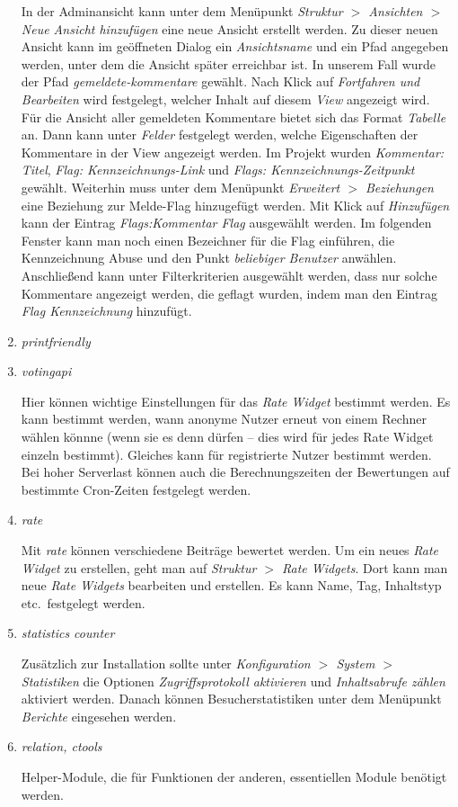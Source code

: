 \documentclass[a4paper,11pt,twoside]{article}
\begin{document}
\begin{enumerate}
In der Adminansicht kann unter dem Menüpunkt \textit{Struktur $>$ Ansichten
  $>$ Neue Ansicht hinzufügen} eine neue Ansicht erstellt werden. Zu dieser
neuen Ansicht kann im geöffneten Dialog ein \textit{Ansichtsname} und ein Pfad
angegeben werden, unter dem die Ansicht später erreichbar ist.  In unserem
Fall wurde der Pfad \textit{gemeldete-kommentare} gewählt. Nach Klick auf
\textit{Fortfahren und Bearbeiten} wird festgelegt, welcher Inhalt auf diesem
\textit{View} angezeigt wird. Für die Ansicht aller gemeldeten Kommentare
bietet sich das Format \textit{Tabelle} an. Dann kann unter \textit{Felder}
festgelegt werden, welche Eigenschaften der Kommentare in der View angezeigt
werden. Im Projekt wurden \textit{Kommentar: Titel}, \textit{Flag:
  Kennzeichnungs-Link} und \textit{Flags: Kennzeichnungs-Zeitpunkt}
gewählt. Weiterhin muss unter dem Menüpunkt \textit{Erweitert $>$ Beziehungen}
eine Beziehung zur Melde-Flag hinzugefügt werden. Mit Klick auf
\textit{Hinzufügen} kann der Eintrag \textit{Flags:Kommentar Flag} ausgewählt
werden. Im folgenden Fenster kann man noch einen Bezeichner für die Flag
einführen, die Kennzeichnung Abuse und den Punkt \textit{beliebiger Benutzer}
anwählen. Anschließend kann unter Filterkriterien ausgewählt werden, dass nur
solche Kommentare angezeigt werden, die geflagt wurden, indem man den Eintrag
\textit{Flag Kennzeichnung} hinzufügt.
\item \emph{printfriendly}
\item \emph{votingapi}

Hier können wichtige Einstellungen für das \emph{Rate Widget} bestimmt werden.
Es kann bestimmt werden, wann anonyme Nutzer erneut von einem Rechner wählen
könnne (wenn sie es denn dürfen -- dies wird für jedes Rate Widget einzeln
bestimmt).  Gleiches kann für registrierte Nutzer bestimmt werden. Bei hoher
Serverlast können auch die Berechnungszeiten der Bewertungen auf bestimmte
Cron-Zeiten festgelegt werden.
\item \emph{rate}

Mit \emph{rate} können verschiedene Beiträge bewertet werden. Um ein neues
\emph{Rate Widget} zu erstellen, geht man auf \textit{Struktur $>$ Rate
  Widgets}.  Dort kann man neue \emph{Rate Widgets} bearbeiten und erstellen.
Es kann Name, Tag, Inhaltstyp etc.\ festgelegt werden.

\item \emph{statistics counter}

Zusätzlich zur Installation sollte unter \textit{Konfiguration $>$ System $>$
  Statistiken} die Optionen \textit{Zugriffsprotokoll aktivieren} und
\textit{Inhaltsabrufe zählen} aktiviert werden. Danach können
Besucherstatistiken unter dem Menüpunkt \textit{Berichte} eingesehen werden.

\item \emph{relation, ctools}

Helper-Module, die für Funktionen der anderen, essentiellen Module benötigt
werden.
\end{enumerate}
\end{document}
